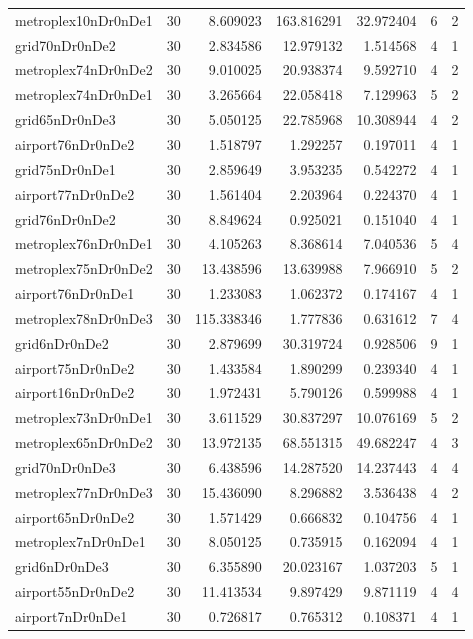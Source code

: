\begin{longtable}{|l|r|r|r|r|r|r|}
metroplex10nDr0nDe1 & 30 & 8.609023 & 163.816291 & 32.972404 & 6 & 2 \\
grid70nDr0nDe2 & 30 & 2.834586 & 12.979132 & 1.514568 & 4 & 1 \\
metroplex74nDr0nDe2 & 30 & 9.010025 & 20.938374 & 9.592710 & 4 & 2 \\
metroplex74nDr0nDe1 & 30 & 3.265664 & 22.058418 & 7.129963 & 5 & 2 \\
grid65nDr0nDe3 & 30 & 5.050125 & 22.785968 & 10.308944 & 4 & 2 \\
airport76nDr0nDe2 & 30 & 1.518797 & 1.292257 & 0.197011 & 4 & 1 \\
grid75nDr0nDe1 & 30 & 2.859649 & 3.953235 & 0.542272 & 4 & 1 \\
airport77nDr0nDe2 & 30 & 1.561404 & 2.203964 & 0.224370 & 4 & 1 \\
grid76nDr0nDe2 & 30 & 8.849624 & 0.925021 & 0.151040 & 4 & 1 \\
metroplex76nDr0nDe1 & 30 & 4.105263 & 8.368614 & 7.040536 & 5 & 4 \\
metroplex75nDr0nDe2 & 30 & 13.438596 & 13.639988 & 7.966910 & 5 & 2 \\
airport76nDr0nDe1 & 30 & 1.233083 & 1.062372 & 0.174167 & 4 & 1 \\
metroplex78nDr0nDe3 & 30 & 115.338346 & 1.777836 & 0.631612 & 7 & 4 \\
grid6nDr0nDe2 & 30 & 2.879699 & 30.319724 & 0.928506 & 9 & 1 \\
airport75nDr0nDe2 & 30 & 1.433584 & 1.890299 & 0.239340 & 4 & 1 \\
airport16nDr0nDe2 & 30 & 1.972431 & 5.790126 & 0.599988 & 4 & 1 \\
metroplex73nDr0nDe1 & 30 & 3.611529 & 30.837297 & 10.076169 & 5 & 2 \\
metroplex65nDr0nDe2 & 30 & 13.972135 & 68.551315 & 49.682247 & 4 & 3 \\
grid70nDr0nDe3 & 30 & 6.438596 & 14.287520 & 14.237443 & 4 & 4 \\
metroplex77nDr0nDe3 & 30 & 15.436090 & 8.296882 & 3.536438 & 4 & 2 \\
airport65nDr0nDe2 & 30 & 1.571429 & 0.666832 & 0.104756 & 4 & 1 \\
metroplex7nDr0nDe1 & 30 & 8.050125 & 0.735915 & 0.162094 & 4 & 1 \\
grid6nDr0nDe3 & 30 & 6.355890 & 20.023167 & 1.037203 & 5 & 1 \\
airport55nDr0nDe2 & 30 & 11.413534 & 9.897429 & 9.871119 & 4 & 4 \\
airport7nDr0nDe1 & 30 & 0.726817 & 0.765312 & 0.108371 & 4 & 1 \\

\end{longtable}
